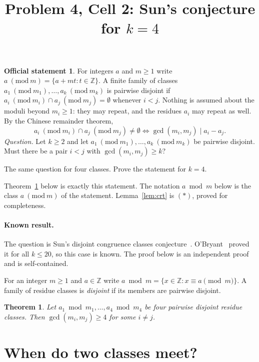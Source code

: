 \documentclass[11pt]{article}
\title{Problem 4, Cell 2: Sun's conjecture for $k=4$}
\author{}
\date{}
\newtheorem{theorem}{Theorem}
\theoremstyle{remark}
\theoremstyle{definition}
\newtheorem*{statement}{Official statement}
\begin{document}
\maketitle

\begin{statement}
For integers $a$ and $m\ge1$ write $a\ (\mathrm{mod}\ m)=\{a+mt:t\in\mathbb{Z}\}$. A finite family
of classes $a_1\ (\mathrm{mod}\ m_1),\dots,a_k\ (\mathrm{mod}\ m_k)$ is pairwise disjoint if
$a_i\ (\mathrm{mod}\ m_i)\cap a_j\ (\mathrm{mod}\ m_j)=\emptyset$ whenever $i<j$. Nothing is assumed
about the moduli beyond $m_i\ge1$: they may repeat, and the residues $a_i$ may repeat as well. By the
Chinese remainder theorem,
\[
  a_i\ (\mathrm{mod}\ m_i)\cap a_j\ (\mathrm{mod}\ m_j)\neq\emptyset\iff\gcd(m_i,m_j)\mid a_i-a_j.\tag{$*$}
\]
\emph{Question.} Let $k\ge2$ and let $a_1\ (\mathrm{mod}\ m_1),\dots,a_k\ (\mathrm{mod}\ m_k)$ be
pairwise disjoint. Must there be a pair $i<j$ with $\gcd(m_i,m_j)\ge k$?

The same question for four classes. Prove the statement for $k=4$.
\end{statement}

\noindent Theorem~\ref{thm:main} below is exactly this statement. The notation $a\bmod m$ below is the class
$a\ (\mathrm{mod}\ m)$ of the statement. Lemma~\ref{lem:crt} is $(*)$, proved for completeness.

\paragraph{Known result.} The question is Sun's disjoint congruence classes conjecture~\cite{Sun06}.
O'Bryant~\cite{OBr07} proved it for all $k\le20$, so this case is known. The proof below is an
independent proof and is self-contained.

For an integer $m\ge1$ and $a\in\mathbb{Z}$ write $a\bmod m=\{x\in\mathbb{Z}: x\equiv a\pmod m\}$.
A family of residue classes is \emph{disjoint} if its members are pairwise disjoint.

\begin{theorem}\label{thm:main}
Let $a_1\bmod m_1,\dots,a_4\bmod m_4$ be four pairwise disjoint residue classes. Then
$\gcd(m_i,m_j)\ge4$ for some $i\ne j$.
\end{theorem}

\section{When do two classes meet?}
\end{document}
